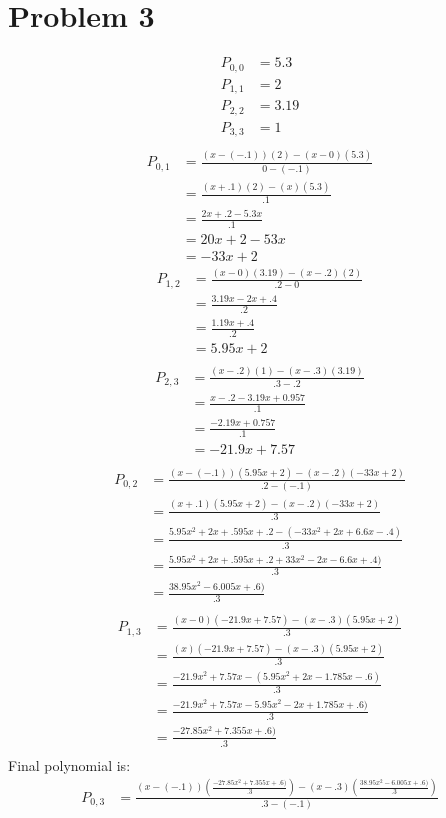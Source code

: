 \documentclass{article}
\begin{document}
\section*{Problem 3}
\begin{align*}
P_{0, 0} &= 5.3 \\
P_{1, 1} &= 2 \\
P_{2, 2} &= 3.19 \\
P_{3, 3} &= 1 \\
\end{align*}
\begin{align*}
P_{0, 1} &= \frac{(x - (-.1))(2) - (x - 0)(5.3)}{0 - (-.1)} \\
&=  \frac{(x + .1)(2) - (x)(5.3)}{.1} \\
&= \frac{2x + .2 - 5.3x}{.1} \\
&= 20x + 2 - 53x \\
&= -33x + 2
\end{align*}
\begin{align*}
P_{1, 2} &= \frac{(x - 0)(3.19) - (x - .2)(2)}{.2 - 0} \\
&=  \frac{3.19x - 2x + .4}{.2} \\
&= \frac{1.19x + .4}{.2} \\
&=  5.95x + 2\\
\end{align*}
\begin{align*}
P_{2, 3} &= \frac{(x - .2)(1) - (x - .3)(3.19)}{.3 - .2}\\
&= \frac{x - .2 - 3.19x + 0.957}{.1}\\
&= \frac{-2.19x + 0.757}{.1} \\
&= -21.9x + 7.57\\
\end{align*}
\begin{align*}
P_{0, 2} &= \frac{(x - (-.1))(5.95x + 2) - (x - .2)(-33x + 2)}{.2 - (-.1)} \\
&=  \frac{(x + .1)(5.95x + 2) - (x - .2)(-33x + 2)}{.3}\\
&= \frac{5.95x^2 + 2x + .595x + .2 - (-33x^2 + 2x + 6.6x -.4)}{.3} \\
&= \frac{5.95x^2 + 2x + .595x + .2 + 33x^2 - 2x - 6.6x +.4)}{.3} \\
&= \frac{38.95x^2 - 6.005x +.6)}{.3} \\
\end{align*}
\begin{align*}
P_{1, 3} &= \frac{(x - 0)(-21.9x + 7.57) - (x - .3)(5.95x +2)}{.3} \\
&= \frac{(x)(-21.9x + 7.57) - (x - .3)(5.95x +2)}{.3} \\
&= \frac{-21.9x^2 + 7.57x - (5.95x^2 + 2x - 1.785x - .6)}{.3} \\
&= \frac{-21.9x^2 + 7.57x - 5.95x^2 - 2x + 1.785x + .6)}{.3} \\
&= \frac{-27.85x^2 + 7.355x + .6)}{.3} \\
\end{align*}
Final polynomial is:
\begin{align*}
P_{0, 3} &= \frac{(x - (-.1))( \frac{-27.85x^2 + 7.355x + .6)}{.3}) - (x - .3)( \frac{38.95x^2 - 6.005x +.6)}{.3})}{.3 - (-.1)}
\end{align*}
\end{document}
